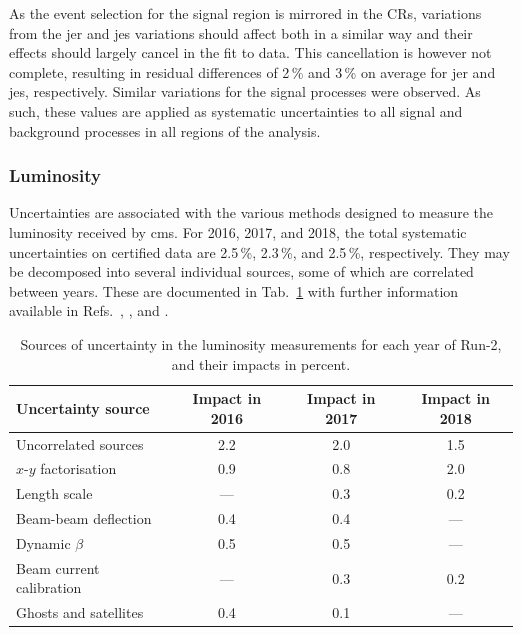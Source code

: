 As the event selection for the signal region is mirrored in the \glspl{CR}, variations from the \acrshort{jer} and \acrshort{jes} variations should affect both in a similar way and their effects should largely cancel in the fit to data. This cancellation is however not complete, resulting in residual differences of 2\,\% and 3\,\% on average for \acrshort{jer} and \acrshort{jes}, respectively. Similar variations for the signal processes were observed. As such, these values are applied as systematic uncertainties to all signal and background processes in all regions of the analysis.




\subsubsection{Luminosity}
\label{subsubsec:htoinv_lumi_syst}

Uncertainties are associated with the various methods designed to measure the luminosity received by \acrshort{cms}. For 2016, 2017, and 2018, the total systematic uncertainties on certified data are 2.5\,\%, 2.3\,\%, and 2.5\,\%, respectively. They may be decomposed into several individual sources, some of which are correlated between years. These are documented in Tab.~\ref{tab:lumi_systs} with further information available in Refs.~, , and .

\begin{table}[htbp]
    \centering
    \begin{tabular}{lccc}
        \toprule
        Uncertainty source & Impact in 2016 & Impact in 2017 & Impact in 2018 \\\midrule
        Uncorrelated sources & 2.2 & 2.0 & 1.5 \\
        $x$-$y$ factorisation & 0.9 & 0.8 & 2.0 \\
        Length scale & --- & 0.3 & 0.2 \\
        Beam-beam deflection & 0.4 & 0.4 & --- \\
        Dynamic $\beta$ & 0.5 & 0.5 & --- \\
        Beam current calibration & --- & 0.3 & 0.2 \\
        Ghosts and satellites & 0.4 & 0.1 & ---  \\
        \bottomrule
    \end{tabular}
    \caption[Sources of uncertainty in the luminosity measurements for each year of Run-2]{Sources of uncertainty in the luminosity measurements for each year of Run-2, and their impacts in percent.}
    \label{tab:lumi_systs}
\end{table}

